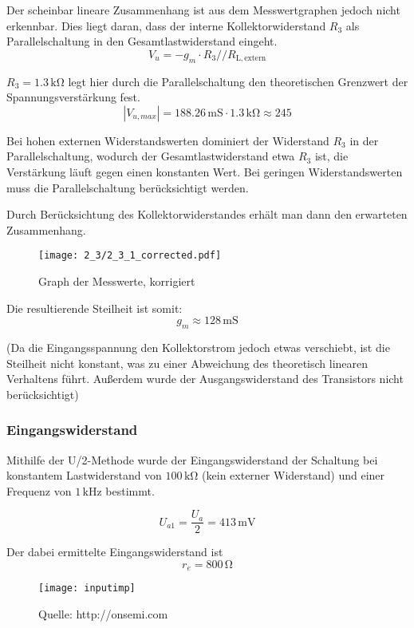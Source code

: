 Der scheinbar lineare Zusammenhang ist aus dem Messwertgraphen jedoch nicht
erkennbar. Dies liegt daran, dass der interne Kollektorwiderstand $R_3$ als
Parallelschaltung in den Gesamtlastwiderstand eingeht.
\[V_u = -g_m \cdot R_3 // R_{\mathrm{L,extern}}\]

$R_3 = 1.3 \, \si{\kilo\ohm}$ legt hier durch die Parallelschaltung den
theoretischen Grenzwert der Spannungsverstärkung fest. \[|V_{u,max}| = 188.26 \,
  \si{\milli\siemens} \cdot 1.3 \, \si{\kilo\ohm} \approx 245\]


Bei hohen externen Widerstandswerten dominiert der Widerstand $R_3$ in der
Parallelschaltung, wodurch der Gesamtlastwiderstand etwa $R_3$ ist, die
Verstärkung läuft gegen einen konstanten Wert.
Bei geringen Widerstandswerten muss die Parallelschaltung berücksichtigt
werden.

Durch Berücksichtung des Kollektorwiderstandes erhält man dann den erwarteten Zusammenhang.

\begin{figure}[H]
  \begin{center}
    \texttt{[image: 2\_3/2\_3\_1\_corrected.pdf]}
  \end{center}
  \caption{Graph der Messwerte, korrigiert}
\end{figure}

Die resultierende Steilheit ist somit:
\[g_m \approx 128 \, \si{\milli\siemens}\]


(Da die Eingangsspannung den Kollektorstrom jedoch etwas verschiebt, ist die
Steilheit nicht konstant, was zu einer Abweichung des theoretisch linearen
Verhaltens führt. Außerdem wurde der Ausgangswiderstand des Transistors nicht berücksichtigt)

\subsubsection{Eingangswiderstand}
Mithilfe der U/2-Methode wurde der Eingangswiderstand der Schaltung bei
konstantem Lastwiderstand von $100 \, \si{\kilo\ohm}$ (kein externer Widerstand)
und einer Frequenz von $1 \, \si{\kilo\hertz}$ bestimmt.

\[U_{a1} = \frac{U_a}{2} = 413 \, \si{\milli\volt}\]

Der dabei ermittelte Eingangswiderstand ist
\[r_e = 800 \, \si{\ohm}\]

\begin{figure}[H]
  \begin{center}
    \texttt{[image: inputimp]}
  \end{center}
  \caption{Quelle: http://onsemi.com}
\end{figure}

